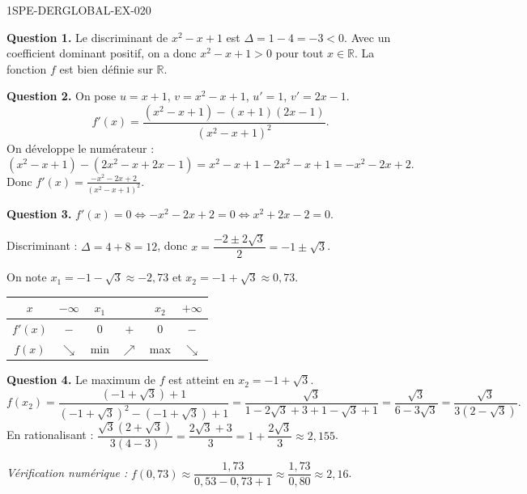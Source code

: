 \begin{corrige}{1SPE-DERGLOBAL-EX-020}

\textbf{Question 1.} Le discriminant de $x^2-x+1$ est $\Delta = 1-4 = -3 < 0$. Avec un coefficient dominant positif, on a donc $x^2-x+1 > 0$ pour tout $x \in \mathbb{R}$. La fonction $f$ est bien définie sur $\mathbb{R}$.

\textbf{Question 2.} On pose $u = x+1$, $v = x^2-x+1$, $u' = 1$, $v' = 2x-1$.
\[
f'(x) = \frac{(x^2-x+1) - (x+1)(2x-1)}{(x^2-x+1)^2}.
\]
On développe le numérateur :
\[
(x^2-x+1) - (2x^2-x+2x-1) = x^2-x+1 - 2x^2-x+1 = -x^2-2x+2.
\]
Donc $\displaystyle f'(x) = \frac{-x^2-2x+2}{(x^2-x+1)^2}$.

\textbf{Question 3.} $f'(x) = 0 \iff -x^2-2x+2 = 0 \iff x^2+2x-2=0$.

Discriminant : $\Delta = 4+8 = 12$, donc $x = \dfrac{-2 \pm 2\sqrt{3}}{2} = -1 \pm \sqrt{3}$.

On note $x_1 = -1-\sqrt{3} \approx -2{,}73$ et $x_2 = -1+\sqrt{3} \approx 0{,}73$.

\begin{center}
\begin{tabular}{|c|ccccc|}
\hline
$x$ & $-\infty$ & $x_1$ & & $x_2$ & $+\infty$ \\
\hline
$f'(x)$ & $-$ & $0$ & $+$ & $0$ & $-$ \\
\hline
$f(x)$ & $\searrow$ & min & $\nearrow$ & max & $\searrow$ \\
\hline
\end{tabular}
\end{center}

\textbf{Question 4.} Le maximum de $f$ est atteint en $x_2 = -1+\sqrt{3}$.
\[
f(x_2) = \frac{(-1+\sqrt{3})+1}{(-1+\sqrt{3})^2-(-1+\sqrt{3})+1} = \frac{\sqrt{3}}{1-2\sqrt{3}+3+1-\sqrt{3}+1} = \frac{\sqrt{3}}{6-3\sqrt{3}} = \frac{\sqrt{3}}{3(2-\sqrt{3})}.
\]
En rationalisant : $\dfrac{\sqrt{3}(2+\sqrt{3})}{3(4-3)} = \dfrac{2\sqrt{3}+3}{3} = 1 + \dfrac{2\sqrt{3}}{3} \approx 2{,}155$.

\textit{Vérification numérique :} $f(0{,}73) \approx \dfrac{1{,}73}{0{,}53-0{,}73+1} \approx \dfrac{1{,}73}{0{,}80} \approx 2{,}16$. \checkmark
\end{corrige}
